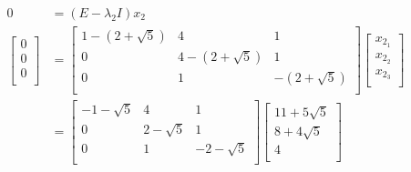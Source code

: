 \documentclass[titlepage]{article}
\begin{document}
\begin{align*}
    0 &= (E-\lambda_2I)x_2\\
    \begin{bmatrix}
        0\\
        0\\
        0\\
    \end{bmatrix}
    &=
    \begin{bmatrix}
        1-(2+\sqrt{5}) & 4 & 1\\
        0 & 4-(2+\sqrt{5}) & 1\\
        0 & 1 & -(2+\sqrt{5})\\
    \end{bmatrix}
    \begin{bmatrix}
        x_{2_1}\\
        x_{2_2}\\
        x_{2_3}\\
    \end{bmatrix}\\
    &=
    \begin{bmatrix}
        -1-\sqrt{5} & 4 & 1\\
        0 & 2-\sqrt{5} & 1\\
        0 & 1 & -2-\sqrt{5}\\
    \end{bmatrix}
    \begin{bmatrix}
        11+5\sqrt{5}\\
        8+4\sqrt{5}\\
        4\\
    \end{bmatrix}
\end{align*}
\end{document}
